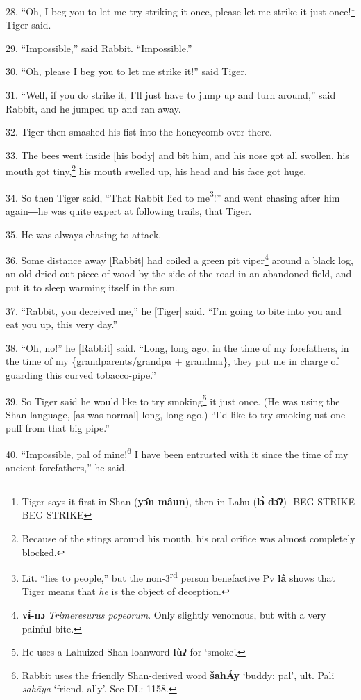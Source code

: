 28. ``Oh, I beg you to let me try striking it once, please let me strike it just
once!\footnote{Tiger says it first in Shan (\textbf{yɔ̂n mâun}), then in Lahu (\textbf{lɔ̀ dɔ̂ʔ})    BEG STRIKE  BEG STRIKE} Tiger said.

29. ``Impossible,'' said Rabbit. ``Impossible.''

30. ``Oh, please I beg you to let me strike it!'' said Tiger.

31. ``Well, if you do strike it, I'll just have to jump up and turn around,'' said
Rabbit, and he jumped up and ran away.

32. Tiger then smashed his fist into the honeycomb over there.

33. The bees went inside [his body] and bit him, and his nose got all swollen,
his mouth got tiny,\footnote{Because of the stings around his mouth, his oral orifice was almost completely blocked.} his mouth swelled up, his head and his face got huge.

34. So then Tiger said, ``That Rabbit lied to me\footnote{Lit. ``lies to people,'' but the non-3\textsuperscript{rd} person benefactive Pv \textbf{lâ} shows that Tiger means that \textit{he} is the object of deception.}!'' and went chasing after
him again―he was quite expert at following trails, that Tiger.

35. He was always chasing to attack.

36. Some distance away [Rabbit] had coiled a green pit viper\footnote{\textbf{ vɨ̀-nɔ }\textit{Trimeresurus popeorum}. Only slightly venomous, but with a very painful bite.} around a black
log, an old dried out piece of wood by the side of the road in an abandoned field,
and put it to sleep warming itself in the sun.

37. ``Rabbit, you deceived me,'' he [Tiger] said. ``I'm going to bite into you
and eat you up, this very day.''

38. ``Oh, no!'' he [Rabbit] said. ``Long, long ago, in the time of my forefathers,
in the time of my \{grandparents/grandpa + grandma\}, they put me in charge of
guarding this curved tobacco-pipe.''

39. So Tiger said he would like to try smoking\footnote{He uses a Lahuized Shan loanword \textbf{lùʔ} for `smoke'.} it just once. (He was using
the Shan language, [as was normal] long, long ago.) ``I'd like to try smoking ust
one puff from that big pipe.''

40. ``Impossible, pal of mine!\footnote{Rabbit uses the friendly Shan-derived word \textbf{šahÁy} `buddy; pal', ult. Pali \textit{sahāya }`friend, ally'. See DL: 1158.} I have been entrusted with it since the time
of my ancient forefathers,'' he said.

